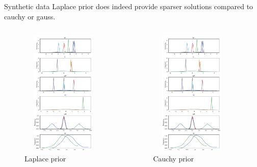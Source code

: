 \documentclass{beamer}
\begin{document}
\begin{frame}{Synthetic data}
	Laplace prior does indeed provide sparser solutions compared to cauchy or gauss.
	\vspace{-8mm}
	\begin{columns}[t]
		\centering
		\begin{figure}
			\includegraphics[width=4cm,height=6cm]{pres_pics/trace_laplace.png}
			\vspace{-3mm}
			\caption{Laplace prior}
		\end{figure}
		\centering
		\begin{figure}
			\includegraphics[width=4cm,height=6cm]{pres_pics/trace_laplace.png}
			\vspace{-3mm}
			\caption{Cauchy prior}
		\end{figure}
	\end{columns}
\end{frame}
\end{document}
